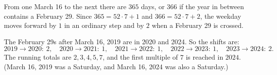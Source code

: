 From one March 16 to the next there are $365$ days, or $366$ if the year in between contains a February 29. Since $365=52\cdot7+1$ and $366=52\cdot7+2$, the weekday moves forward by $1$ in an ordinary step and by $2$ when a February 29 is crossed.

The February 29s after March 16, 2019 are in 2020 and 2024. So the shifts are:
\[
2019\to2020:\ 2,\quad 2020\to2021:\ 1,\quad 2021\to2022:\ 1,\quad 2022\to2023:\ 1,\quad 2023\to2024:\ 2 .
\]
The running totals are $2,3,4,5,7$, and the first multiple of $7$ is reached in $\boxed{2024}$. (March 16, 2019 was a Saturday, and March 16, 2024 was also a Saturday.)
